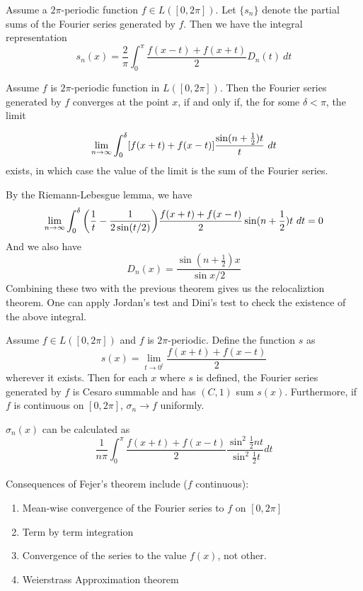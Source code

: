 \documentclass[10pt,a4paper]{book}
\begin{document}
\begin{Thm}
Assume a $2\pi$-periodic function $f\in L([0,2\pi])$. Let $\{s_n\}$ denote the partial sums of the Fourier series generated by $f$.
Then we have the integral representation 
$$s_n(x) = \dfrac{2}\pi \int_{0}^\pi \dfrac{f(x-t) + f(x+t)}2D_n(t) \ dt$$
\end{Thm}

\begin{Thm}
Assume $f$ is $2\pi$-periodic function in $L([0,2\pi])$. Then the Fourier series generated by $f$ converges at the point $x$, if and only if, the for some $\delta < \pi$, the limit

$$\lim_{ n \to \infty} \int_{0}^\delta [f(x+t)+f(x-t)]\dfrac{\sin(n+ \frac{1}2)t}t \ dt$$ 
exists, in which case the value of the limit is the sum of the Fourier series.
\end{Thm}
\PP By the Riemann-Lebesgue lemma, we have
$$\lim_{ n \to \infty} \int_{0}^\delta \bigg(\dfrac{1}t -  \dfrac{1}{2\sin(t/2)}\bigg) \dfrac{f(x+t)+f(x-t)}2 \sin(n+ \frac{1}2)t\ dt = 0$$
And we also have
$$D_n(x) = \dfrac{\sin(n+ \frac{1}2)x}{\sin x/2}$$
Combining these two with the previous theorem gives us the relocaliztion theorem. One can apply Jordan's test and Dini's test to check the existence of the above integral.


\begin{Thm}
Assume $f\in L([0,2\pi])$ and $f$ is $2\pi$-periodic. Define the function $s$ as
$$s(x) = \lim_{t \to 0^t} \dfrac{f(x+t)+f(x-t)}{2}$$
wherever it exists. Then for each $x$ where $s$ is defined, the Fourier series generated by $f$ is Cesaro summable and has $(C,1)$ sum $s(x)$. Furthermore, if $f$ is continuous on $[0,2\pi]$, $\sigma_n \to f$ uniformly.


\end{Thm}
\PP $\sigma_n(x)$ can be calculated as
$$\dfrac{1}{n\pi}\int_{0}^\pi\dfrac{f(x+t)+f(x-t)}{2} \dfrac{\sin^2 \frac{1}{2} n t}{\sin^2 \frac{1}{2} t} dt$$
\\
Consequences of Fejer's theorem include ($f$ continuous):
\begin{enumerate}
    \item Mean-wise convergence of the Fourier series to $f$ on $[0,2\pi]$
    \item Term by term integration
    \item Convergence of the series to the value $f(x)$, not other.
    \item Weierstrass Approximation theorem
\end{enumerate}
\end{document}
